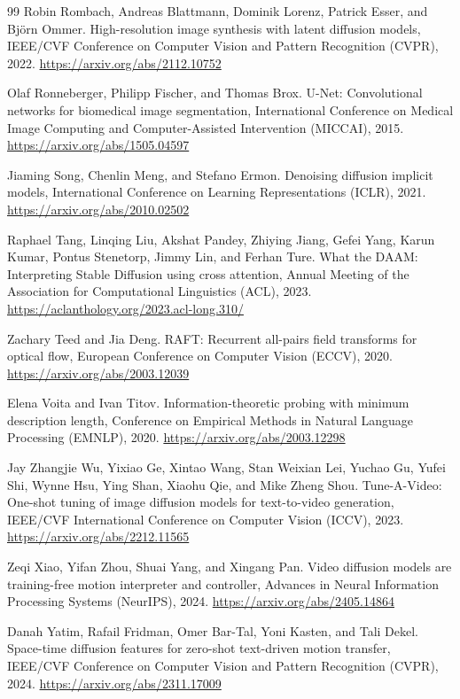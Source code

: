\documentclass[twoside,english]{article}
\begin{document}
\begin{thebibliography}{99}
 Robin Rombach, Andreas Blattmann, Dominik Lorenz, Patrick Esser, and Bj\"orn Ommer. High-resolution image synthesis with latent diffusion models, IEEE/CVF Conference on Computer Vision and Pattern Recognition (CVPR), 2022. \url{https://arxiv.org/abs/2112.10752}

 Olaf Ronneberger, Philipp Fischer, and Thomas Brox. U-Net: Convolutional networks for biomedical image segmentation, International Conference on Medical Image Computing and Computer-Assisted Intervention (MICCAI), 2015. \url{https://arxiv.org/abs/1505.04597}

 Jiaming Song, Chenlin Meng, and Stefano Ermon. Denoising diffusion implicit models, International Conference on Learning Representations (ICLR), 2021. \url{https://arxiv.org/abs/2010.02502}

 Raphael Tang, Linqing Liu, Akshat Pandey, Zhiying Jiang, Gefei Yang, Karun Kumar, Pontus Stenetorp, Jimmy Lin, and Ferhan Ture. What the DAAM: Interpreting Stable Diffusion using cross attention, Annual Meeting of the Association for Computational Linguistics (ACL), 2023. \url{https://aclanthology.org/2023.acl-long.310/}

 Zachary Teed and Jia Deng. RAFT: Recurrent all-pairs field transforms for optical flow, European Conference on Computer Vision (ECCV), 2020. \url{https://arxiv.org/abs/2003.12039}

 Elena Voita and Ivan Titov. Information-theoretic probing with minimum description length, Conference on Empirical Methods in Natural Language Processing (EMNLP), 2020. \url{https://arxiv.org/abs/2003.12298}

 Jay Zhangjie Wu, Yixiao Ge, Xintao Wang, Stan Weixian Lei, Yuchao Gu, Yufei Shi, Wynne Hsu, Ying Shan, Xiaohu Qie, and Mike Zheng Shou. Tune-A-Video: One-shot tuning of image diffusion models for text-to-video generation, IEEE/CVF International Conference on Computer Vision (ICCV), 2023. \url{https://arxiv.org/abs/2212.11565}

 Zeqi Xiao, Yifan Zhou, Shuai Yang, and Xingang Pan. Video diffusion models are training-free motion interpreter and controller, Advances in Neural Information Processing Systems (NeurIPS), 2024. \url{https://arxiv.org/abs/2405.14864}

 Danah Yatim, Rafail Fridman, Omer Bar-Tal, Yoni Kasten, and Tali Dekel. Space-time diffusion features for zero-shot text-driven motion transfer, IEEE/CVF Conference on Computer Vision and Pattern Recognition (CVPR), 2024. \url{https://arxiv.org/abs/2311.17009}


\end{thebibliography}
\end{document}
